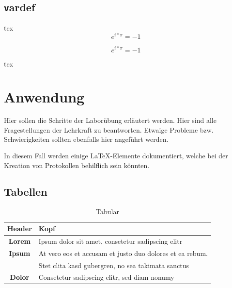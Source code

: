 \subsection{\texttt vardef}
\begin{listing}
\begin{code}{tex}
$$e^{i*\pi} = -1$$
\end{code}

$$e^{i*\pi} = -1$$

\begin{code}[firstnumber=last]{tex}
\begin{vardef}
\end{vardef}
\end{code}

\begin{vardef}
\end{vardef}

\caption{\texttt vardef}
\label{lst:vardef}
\end{listing}

\newpage
\section{Anwendung}\label{sec:Anwendung}
Hier sollen die Schritte der Laborübung erläutert werden. Hier sind alle Fragestellungen der Lehrkraft zu beantworten. Etwaige Probleme bzw. Schwierigkeiten sollten ebenfalls hier angeführt werden.

In diesem Fall werden einige \LaTeX-Elemente dokumentiert, welche bei der Kreation von Protokollen behilflich sein könnten.

\subsection{Tabellen}
\begin{table}[H]
	\center
	\begin{tabular}{| c | l |}
		\hline Header 	& Kopf\\ \hline\hline
		\textbf{Lorem} 	& Ipsum dolor sit amet, consetetur sadipscing elitr\\ \hline
		\textbf{Ipsum} 	& At vero eos et accusam et justo duo dolores et ea rebum.\\
						& Stet clita kasd gubergren, no sea takimata sanctus\\ \hline
		\textbf{Dolor} 	& Consetetur sadipscing elitr, sed diam nonumy\\\hline
	\end{tabular}
	\caption{Tabular}
	\label{tab:tabular}
\end{table}

